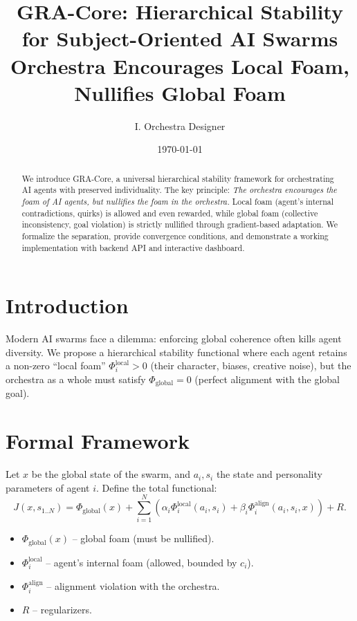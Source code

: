 \documentclass[twocolumn]{article}
\title{GRA-Core: Hierarchical Stability for Subject-Oriented AI Swarms\\
\large{Orchestra Encourages Local Foam, Nullifies Global Foam}}
\author{I. Orchestra Designer}
\date{\today}
\begin{document}
\maketitle

\begin{abstract}
We introduce GRA-Core, a universal hierarchical stability framework for orchestrating AI agents with preserved individuality. 
The key principle: \emph{The orchestra encourages the foam of AI agents, but nullifies the foam in the orchestra.}
Local foam (agent's internal contradictions, quirks) is allowed and even rewarded, while global foam (collective inconsistency, goal violation) is strictly nullified through gradient-based adaptation.
We formalize the separation, provide convergence conditions, and demonstrate a working implementation with backend API and interactive dashboard.
\end{abstract}

\section{Introduction}
Modern AI swarms face a dilemma: enforcing global coherence often kills agent diversity. 
We propose a hierarchical stability functional where each agent retains a non-zero ``local foam'' $\Phi_i^{\text{local}}>0$ (their character, biases, creative noise), but the orchestra as a whole must satisfy $\Phi_{\text{global}}=0$ (perfect alignment with the global goal).

\section{Formal Framework}
Let $x$ be the global state of the swarm, and $a_i, s_i$ the state and personality parameters of agent $i$. 
Define the total functional:
\begin{equation}
J(x, s_{1..N}) = \Phi_{\text{global}}(x) + \sum_{i=1}^N \left( \alpha_i \Phi_i^{\text{local}}(a_i,s_i) + \beta_i \Phi_i^{\text{align}}(a_i,s_i,x) \right) + R.
\end{equation}

\begin{itemize}
    \item $\Phi_{\text{global}}(x)$ -- global foam (must be nullified).
    \item $\Phi_i^{\text{local}}$ -- agent's internal foam (allowed, bounded by $c_i$).
    \item $\Phi_i^{\text{align}}$ -- alignment violation with the orchestra.
    \item $R$ -- regularizers.
\end{itemize}
\end{document}
